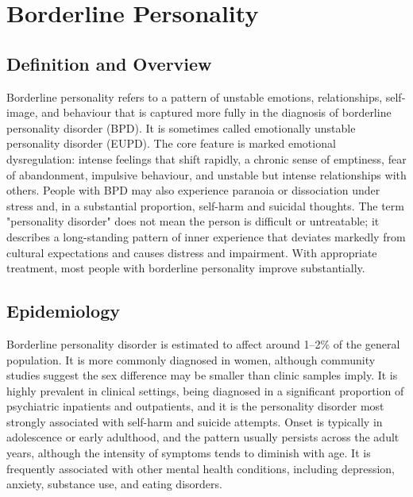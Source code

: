 \chapter{Borderline Personality}

\section*{Definition and Overview}
Borderline personality refers to a pattern of unstable emotions, relationships, self-image, and behaviour that is captured more fully in the diagnosis of borderline personality disorder (BPD). It is sometimes called emotionally unstable personality disorder (EUPD). The core feature is marked emotional dysregulation: intense feelings that shift rapidly, a chronic sense of emptiness, fear of abandonment, impulsive behaviour, and unstable but intense relationships with others. People with BPD may also experience paranoia or dissociation under stress and, in a substantial proportion, self-harm and suicidal thoughts. The term "personality disorder" does not mean the person is difficult or untreatable; it describes a long-standing pattern of inner experience that deviates markedly from cultural expectations and causes distress and impairment. With appropriate treatment, most people with borderline personality improve substantially.

\section*{Epidemiology}
Borderline personality disorder is estimated to affect around 1--2\% of the general population. It is more commonly diagnosed in women, although community studies suggest the sex difference may be smaller than clinic samples imply. It is highly prevalent in clinical settings, being diagnosed in a significant proportion of psychiatric inpatients and outpatients, and it is the personality disorder most strongly associated with self-harm and suicide attempts. Onset is typically in adolescence or early adulthood, and the pattern usually persists across the adult years, although the intensity of symptoms tends to diminish with age. It is frequently associated with other mental health conditions, including depression, anxiety, substance use, and eating disorders.

